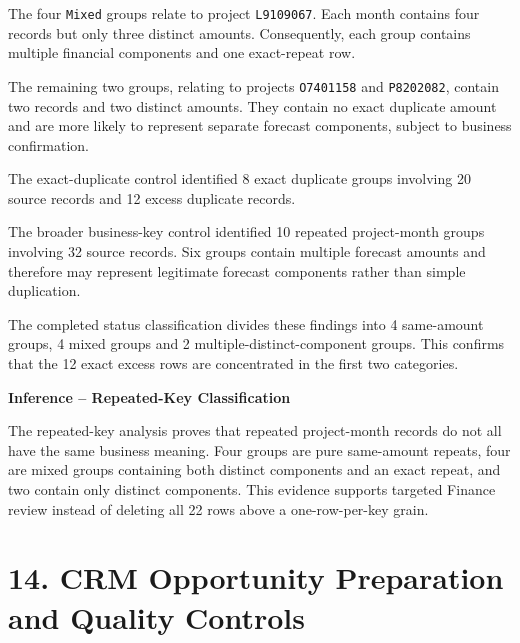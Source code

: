 \documentclass[11pt,a4paper]{article}
\begin{document}
The four \texttt{Mixed} groups relate to project \texttt{L9109067}. Each month
contains four records but only three distinct amounts. Consequently, each
group contains multiple financial components and one exact-repeat row.

The remaining two groups, relating to projects \texttt{O7401158} and
\texttt{P8202082}, contain two records and two distinct amounts. They contain
no exact duplicate amount and are more likely to represent separate forecast
components, subject to business confirmation.

\begin{successbox}

\textbf{\color{SuccessGreen}{Repeated-Key Control Result}}

The exact-duplicate control identified 8 exact duplicate groups involving
20 source records and 12 excess duplicate records.

The broader business-key control identified 10 repeated project-month groups
involving 32 source records. Six groups contain multiple forecast amounts and
therefore may represent legitimate forecast components rather than simple
duplication.

The completed status classification divides these findings into 4 same-amount
groups, 4 mixed groups and 2 multiple-distinct-component groups. This confirms
that the 12 exact excess rows are concentrated in the first two categories.

\end{successbox}

\begin{inferencebox}

\textbf{Inference -- Repeated-Key Classification}

The repeated-key analysis proves that repeated project-month records do not
all have the same business meaning. Four groups are pure same-amount repeats,
four are mixed groups containing both distinct components and an exact repeat,
and two contain only distinct components. This evidence supports targeted
Finance review instead of deleting all 22 rows above a one-row-per-key grain.

\end{inferencebox}


\clearpage

\section{14. CRM Opportunity Preparation and Quality Controls}
\end{document}
